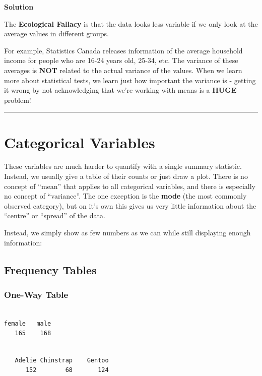 \documentclass[
  letterpaper,
  DIV=11,
  numbers=noendperiod,
  oneside]{scrreprt}
\begin{document}
\textbf{Solution}

The \textbf{Ecological Fallacy} is that the data looks less variable if
we only look at the average values in different groups.

For example, Statistics Canada releases information of the average
household income for people who are 16-24 years old, 25-34, etc. The
variance of these averages is \textbf{NOT} related to the actual
variance of the values. When we learn more about statistical tests, we
learn just how important the variance is - getting it wrong by not
acknowledging that we're working with means is a \textbf{HUGE} problem!

\begin{center}\rule{0.5\linewidth}{0.5pt}\end{center}

\hypertarget{categorical-variables}{%
\section{Categorical Variables}\label{categorical-variables}}

These variables are much harder to quantify with a single summary
statistic. Instead, we usually give a table of their counts or just draw
a plot. There is no concept of ``mean'' that applies to all categorical
variables, and there is especially no concept of ``variance''. The one
exception is the \textbf{mode} (the most commonly observed category),
but on it's own this gives us very little information about the
``centre'' or ``spread'' of the data.

Instead, we simply show as few numbers as we can while still displaying
enough information:

\hypertarget{frequency-tables}{%
\subsection{Frequency Tables}\label{frequency-tables}}

\hypertarget{one-way-table}{%
\subsubsection{One-Way Table}\label{one-way-table}}

\begin{verbatim}

female   male 
   165    168 
\end{verbatim}

\begin{verbatim}

   Adelie Chinstrap    Gentoo 
      152        68       124 
\end{verbatim}
\end{document}
